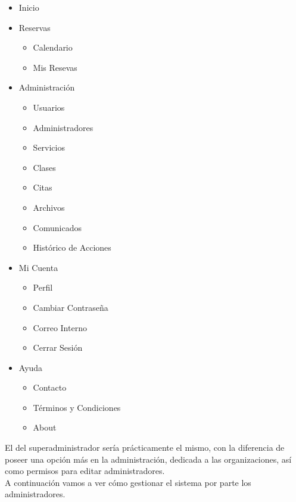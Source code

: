 \begin{itemize}
\item Inicio
\item Reservas

\begin{itemize}
\item Calendario
\item Mis Resevas
\end{itemize}

\item Administración

\begin{itemize}
\item Usuarios
\item Administradores
\item Servicios
\item Clases
\item Citas
\item Archivos
\item Comunicados
\item Histórico de Acciones
\end{itemize}

\item Mi Cuenta

\begin{itemize}
\item Perfil
\item Cambiar Contraseña
\item Correo Interno
\item Cerrar Sesión
\end{itemize}

\item Ayuda

\begin{itemize}
\item Contacto
\item Términos y Condiciones
\item About
\end{itemize}

\end{itemize}

El del superadministrador sería prácticamente el mismo, con la diferencia de poseer una opción más en la administración, dedicada a las organizaciones, así como permisos para editar administradores.\\

A continuación vamos a ver cómo gestionar el sistema por parte los administradores. \\

